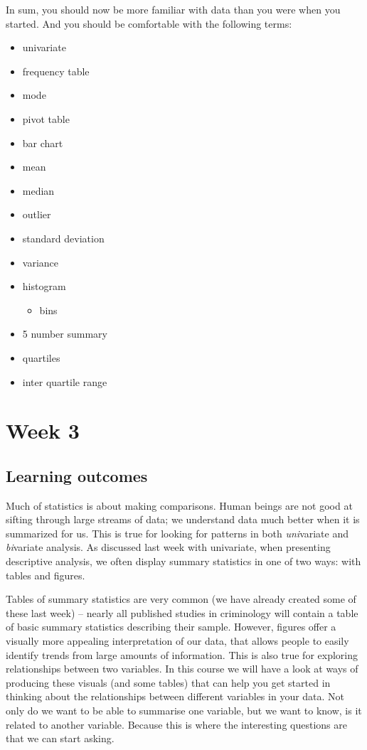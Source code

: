 \documentclass[]{book}
\providecommand{\tightlist}{%
  \setlength{\itemsep}{0pt}\setlength{\parskip}{0pt}}
\theoremstyle{definition}
\theoremstyle{definition}
\theoremstyle{definition}
\theoremstyle{remark}
\begin{document}
In sum, you should now be more familiar with data than you were when you
started. And you should be comfortable with the following terms:

\begin{itemize}
\tightlist
\item
  univariate
\item
  frequency table
\item
  mode
\item
  pivot table
\item
  bar chart
\item
  mean
\item
  median
\item
  outlier
\item
  standard deviation
\item
  variance
\item
  histogram

  \begin{itemize}
  \tightlist
  \item
    bins
  \end{itemize}
\item
  5 number summary
\item
  quartiles
\item
  inter quartile range
\end{itemize}

\hypertarget{week3}{%
\chapter{Week 3}\label{week3}}

\hypertarget{learning-outcomes-2}{%
\section{Learning outcomes}\label{learning-outcomes-2}}

Much of statistics is about making comparisons. Human beings are not
good at sifting through large streams of data; we understand data much
better when it is summarized for us. This is true for looking for
patterns in both \emph{uni}variate and \emph{bi}variate analysis. As
discussed last week with univariate, when presenting descriptive
analysis, we often display summary statistics in one of two ways: with
tables and figures.

Tables of summary statistics are very common (we have already created
some of these last week) -- nearly all published studies in criminology
will contain a table of basic summary statistics describing their
sample. However, figures offer a visually more appealing interpretation
of our data, that allows people to easily identify trends from large
amounts of information. This is also true for exploring relationships
between two variables. In this course we will have a look at ways of
producing these visuals (and some tables) that can help you get started
in thinking about the relationships between different variables in your
data. Not only do we want to be able to summarise one variable, but we
want to know, is it related to another variable. Because this is where
the interesting questions are that we can start asking.
\end{document}
